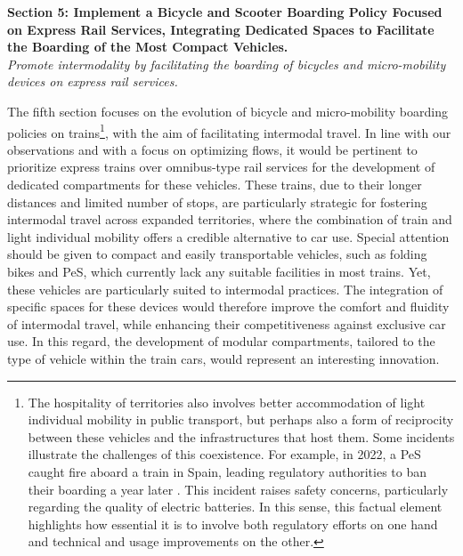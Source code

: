 \begin{refsegment}
    \begin{displayquote}
\textbf{Section 5: Implement a Bicycle and Scooter Boarding Policy Focused on Express Rail Services, Integrating Dedicated Spaces to Facilitate the Boarding of the Most Compact Vehicles.}
\\
\textsl{Promote intermodality by facilitating the boarding of bicycles and micro-mobility devices on express rail services.}
    \end{displayquote}
The fifth section focuses on the evolution of bicycle and micro-mobility boarding policies on trains\footnote{
    The hospitality of territories also involves better accommodation of light individual mobility in public transport, but perhaps also a form of reciprocity between these vehicles and the infrastructures that host them. Some incidents illustrate the challenges of this coexistence. For example, in 2022, a \acrfull{PeS} caught fire aboard a train in Spain, leading regulatory authorities to ban their boarding a year later \textcolor{blue}{\autocite{cottrel_trottinette_2022}}. This incident raises safety concerns, particularly regarding the quality of electric batteries. In this sense, this factual element highlights how essential it is to involve both regulatory efforts on one hand and technical and usage improvements on the other.
}, with the aim of facilitating intermodal travel. In line with our observations and with a focus on optimizing flows, it would be pertinent to prioritize express trains over omnibus-type rail services for the development of dedicated compartments for these vehicles. These trains, due to their longer distances and limited number of stops, are particularly strategic for fostering intermodal travel across expanded territories, where the combination of train and light individual mobility offers a credible alternative to car use. Special attention should be given to compact and easily transportable vehicles, such as folding bikes and \acrfull{PeS}, which currently lack any suitable facilities in most trains. Yet, these vehicles are particularly suited to intermodal practices. The integration of specific spaces for these devices would therefore improve the comfort and fluidity of intermodal travel, while enhancing their competitiveness against exclusive car use. In this regard, the development of modular compartments, tailored to the type of vehicle within the train cars, would represent an interesting innovation.%


\end{refsegment}

